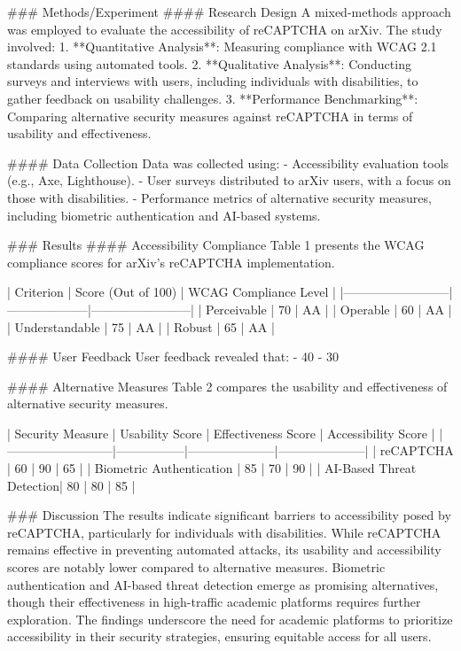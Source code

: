 ### Methods/Experiment
#### Research Design
A mixed-methods approach was employed to evaluate the accessibility of reCAPTCHA on arXiv. The study involved:
1. **Quantitative Analysis**: Measuring compliance with WCAG 2.1 standards using automated tools.
2. **Qualitative Analysis**: Conducting surveys and interviews with users, including individuals with disabilities, to gather feedback on usability challenges.
3. **Performance Benchmarking**: Comparing alternative security measures against reCAPTCHA in terms of usability and effectiveness.

#### Data Collection
Data was collected using:
- Accessibility evaluation tools (e.g., Axe, Lighthouse).
- User surveys distributed to arXiv users, with a focus on those with disabilities.
- Performance metrics of alternative security measures, including biometric authentication and AI-based systems.

### Results
#### Accessibility Compliance
Table 1 presents the WCAG compliance scores for arXiv's reCAPTCHA implementation.

| Criterion                | Score (Out of 100) | WCAG Compliance Level |
|--------------------------|--------------------|------------------------|
| Perceivable              | 70                 | AA                    |
| Operable                 | 60                 | AA                    |
| Understandable           | 75                 | AA                    |
| Robust                   | 65                 | AA                    |

#### User Feedback
User feedback revealed that:
- 40%
- 30%

#### Alternative Measures
Table 2 compares the usability and effectiveness of alternative security measures.

| Security Measure         | Usability Score | Effectiveness Score | Accessibility Score |
|--------------------------|-----------------|---------------------|---------------------|
| reCAPTCHA                | 60              | 90                  | 65                  |
| Biometric Authentication | 85              | 70                  | 90                  |
| AI-Based Threat Detection| 80              | 80                  | 85                  |

### Discussion
The results indicate significant barriers to accessibility posed by reCAPTCHA, particularly for individuals with disabilities. While reCAPTCHA remains effective in preventing automated attacks, its usability and accessibility scores are notably lower compared to alternative measures. Biometric authentication and AI-based threat detection emerge as promising alternatives, though their effectiveness in high-traffic academic platforms requires further exploration. The findings underscore the need for academic platforms to prioritize accessibility in their security strategies, ensuring equitable access for all users.

